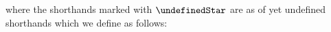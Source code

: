 \begin{description}
\begin{description}
\[					%
				\]
				where the shorthands marked with $\undefinedStar$ are as of yet undefined shorthands which we define as follows:

\end{description}
\end{description}
